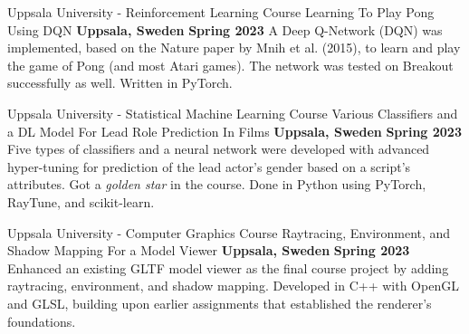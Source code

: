 

\begin{cventries}


       \cventry
        {Uppsala University - Reinforcement Learning Course} %
        {Learning To Play Pong Using DQN} %
        {\textbf{Uppsala, Sweden}} %
        {\textbf{Spring 2023}} %
        {
            A Deep Q-Network (DQN) was implemented, based on the Nature paper by Mnih et al. (2015), to learn and play the game of Pong (and most Atari games). The network was tested on Breakout successfully as well. Written in PyTorch.
        }
        

       \cventry
        {Uppsala University - Statistical Machine Learning Course} %
        {Various Classifiers and a DL Model For Lead Role Prediction In Films} %
        {\textbf{Uppsala, Sweden}} %
        {\textbf{Spring 2023}} %
        {
            Five types of classifiers and a neural network were developed with advanced hyper-tuning for prediction of the lead actor's gender based on a script's attributes. Got a \emph{golden star} in the course. Done in Python using PyTorch, RayTune, and scikit-learn.
        }

    \cventry
    {Uppsala University - Computer Graphics Course} %
    {Raytracing, Environment, and Shadow Mapping For a Model Viewer} %
    {\textbf{Uppsala, Sweden}} %
    {\textbf{Spring 2023}} %
    {
        Enhanced an existing GLTF model viewer as the final course project by adding raytracing, environment, and shadow mapping. Developed in C++ with OpenGL and GLSL, building upon earlier assignments that established the renderer's foundations.
    }
  

\end{cventries}
